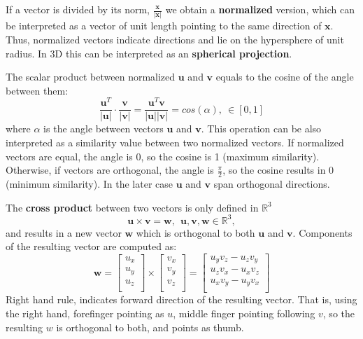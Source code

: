 If a vector is divided by its norm, $\frac{\mathbf{x}}{ \vert \mathbf{x} \vert }$ we obtain a \textbf{normalized} version, which can be interpreted as a vector of unit length pointing to the same direction of $\mathbf{x}$. Thus, normalized vectors indicate directions and lie on the hypersphere of unit radius. In 3D this can be interpreted as an \textbf{spherical projection}.

The scalar product between normalized $\mathbf{u}$ and $\mathbf{v}$ equals to the cosine of the angle between them:
\begin{equation}
 \frac{\mathbf{u}^T}{\vert \mathbf{u} \vert} \cdot \frac{\mathbf{v}}{\vert \mathbf{v} \vert} = 
 \frac{\mathbf{u}^T\mathbf{v}}{\vert \mathbf{u} \vert \vert \mathbf{v} \vert} =
 cos (\alpha) , \ \in [0,1]
\end{equation}
where $\alpha$ is the angle between vectors $\mathbf{u}$ and $\mathbf{v}$. This operation can be also interpreted as a similarity value between two normalized vectors. If normalized vectors are equal, the angle is 0, so the cosine is 1 (maximum similarity). Otherwise, if vectors are orthogonal, the angle is $\frac{\pi}{2}$, so the cosine results in 0 (minimum similarity). In the later case $\mathbf{u}$ and $\mathbf{v}$ span orthogonal directions. 

The \textbf{cross product} between two vectors is only defined in $\mathbb{R}^3$
\begin{equation}
 \mathbf{u} \times \mathbf{v} = \mathbf{w} , \ \ \mathbf{u},\mathbf{v},\mathbf{w} \in \mathbb{R}^3, 
\end{equation}
and results in a new vector $\mathbf{w}$ which is orthogonal to both $\mathbf{u}$ and $\mathbf{v}$. Components of the resulting vector are computed as: 
\begin{equation}
\mathbf{w} = 
\left[
\begin{array}{ccc}
  u_x\\
  u_y\\
  u_z\\
\end{array}
\right]
\times
\left[
\begin{array}{ccc}
  v_x\\
  v_y\\
  v_z\\
\end{array}
\right]
 = 
\left[
\begin{array}{ccc}
  u_y v_z - u_z v_y\\
  u_z v_x - u_x v_z\\
  u_x v_y - u_y v_x\\
\end{array}
\right]
 \end{equation}
Right hand rule, indicates forward direction of the resulting vector. That is, using the right hand, forefinger pointing as $u$, middle finger pointing following $v$, so the resulting $w$ is orthogonal to both, and points as thumb. 

